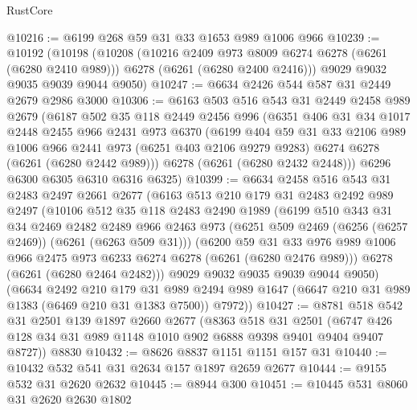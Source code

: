 \begin{lexlean}{RustCore}
\begin{coremodule}
@10216 := @6199 @268 @59 @31 @33 @1653 @989 @1006 @966
@10239 := @10192
    (@10198
      (@10208
        (@10216 @2409 @973 @8009 @6274 @6278 (@6261 (@6280 @2410 @989)))
        @6278
        (@6261 (@6280 @2400 @2416)))
      @9029
      @9032
      @9035
      @9039
      @9044
      @9050)
@10247 := @6634 @2426 @544 @587 @31 @2449 @2679 @2986 @3000
@10306 := @6163
    @503
    @516
    @543
    @31
    @2449
    @2458
    @989
    @2679
    (@6187
      @502
      @35
      @118
      @2449
      @2456
      @996
      (@6351
        @406
        @31
        @34
        @1017
        @2448
        @2455
        @966
        @2431
        @973
        @6370
        (@6199
          @404
          @59
          @31
          @33
          @2106
          @989
          @1006
          @966
          @2441
          @973
          (@6251 @403 @2106 @9279 @9283)
          @6274
          @6278
          (@6261 (@6280 @2442 @989)))
        @6278
        (@6261 (@6280 @2432 @2448)))
      @6296
      @6300
      @6305
      @6310
      @6316
      @6325)
@10399 := @6634
    @2458
    @516
    @543
    @31
    @2483
    @2497
    @2661
    @2677
    (@6163
      @513
      @210
      @179
      @31
      @2483
      @2492
      @989
      @2497
      (@10106
        @512
        @35
        @118
        @2483
        @2490
        @1989
        (@6199
          @510
          @343
          @31
          @34
          @2469
          @2482
          @2489
          @966
          @2463
          @973
          (@6251 @509 @2469 (@6256 (@6257 @2469)) (@6261 (@6263 @509 @31)))
          (@6200
            @59
            @31
            @33
            @976
            @989
            @1006
            @966
            @2475
            @973
            @6233
            @6274
            @6278
            (@6261 (@6280 @2476 @989)))
          @6278
          (@6261 (@6280 @2464 @2482)))
        @9029
        @9032
        @9035
        @9039
        @9044
        @9050)
      (@6634
        @2492
        @210
        @179
        @31
        @989
        @2494
        @989
        @1647
        (@6647 @210 @31 @989 @1383 (@6469 @210 @31 @1383 @7500))
        @7972))
@10427 := @8781
    @518
    @542
    @31
    @2501
    @139
    @1897
    @2660
    @2677
    (@8363
      @518
      @31
      @2501
      (@6747 @426 @128 @34 @31 @989 @1148 @1010 @902 @6888 @9398 @9401 @9404 @9407 @8727))
    @8830
@10432 := @8626 @8837 @1151 @1151 @157 @31
@10440 := @10432 @532 @541 @31 @2634 @157 @1897 @2659 @2677
@10444 := @9155 @532 @31 @2620 @2632
@10445 := @8944 @300
@10451 := @10445 @531 @8060 @31 @2620 @2630 @1802

\end{coremodule}
\end{lexlean}
